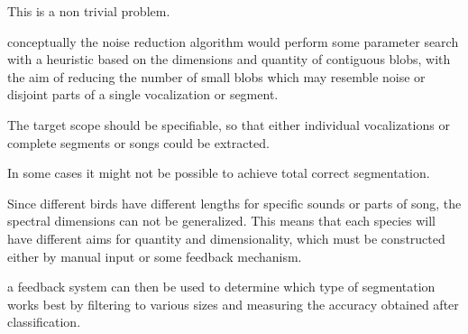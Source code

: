 This is a non trivial problem.

conceptually the noise reduction algorithm would perform some parameter search
with a heuristic based on the dimensions and quantity of contiguous blobs, with
the aim of reducing the number of small blobs which may resemble noise or disjoint
parts of a single vocalization or segment.

The target scope should be specifiable, so that either individual vocalizations
or complete segments or songs could be extracted.

In some cases it might not be possible to achieve total correct segmentation.

Since different birds have different lengths for specific sounds or parts of song,
the spectral dimensions can not be generalized.
This means that each species will have different aims for quantity and dimensionality,
which must be constructed either by manual input or some feedback mechanism.

a feedback system can then be used to determine which type of segmentation works
best by filtering to various sizes and measuring the accuracy obtained after
classification.
